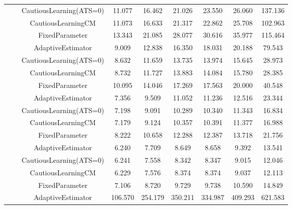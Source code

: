 \begin{table}[!h]
\begin{tabular}[t]{ccccccccc}
 &  & CautiousLearning(ATS=0) & 11.077 & 16.462 & 21.026 & 23.550 & 26.060 & 137.136\\

 &  & CautiousLearningCM & 11.073 & 16.633 & 21.317 & 22.862 & 25.708 & 102.963\\

 & \multirow[t]{-4}{*}{\centering\arraybackslash 0.75} & FixedParameter & 13.343 & 21.085 & 28.077 & 30.616 & 35.977 & 115.464\\
\cmidrule{2-9}
 &  & AdaptiveEstimator & 9.009 & 12.838 & 16.350 & 18.031 & 20.188 & 79.543\\

 &  & CautiousLearning(ATS=0) & 8.632 & 11.659 & 13.735 & 13.974 & 15.645 & 28.973\\

 &  & CautiousLearningCM & 8.732 & 11.727 & 13.883 & 14.084 & 15.780 & 28.385\\

 & \multirow[t]{-4}{*}{\centering\arraybackslash 1.00} & FixedParameter & 10.095 & 14.046 & 17.269 & 17.563 & 20.000 & 40.548\\
\cmidrule{2-9}
 &  & AdaptiveEstimator & 7.356 & 9.509 & 11.052 & 11.236 & 12.516 & 23.344\\

 &  & CautiousLearning(ATS=0) & 7.198 & 9.091 & 10.289 & 10.340 & 11.343 & 16.834\\

 &  & CautiousLearningCM & 7.179 & 9.124 & 10.357 & 10.391 & 11.377 & 16.988\\

 & \multirow[t]{-4}{*}{\centering\arraybackslash 1.25} & FixedParameter & 8.222 & 10.658 & 12.288 & 12.387 & 13.718 & 21.756\\
\cmidrule{2-9}
 &  & AdaptiveEstimator & 6.240 & 7.709 & 8.649 & 8.658 & 9.392 & 13.541\\

 &  & CautiousLearning(ATS=0) & 6.241 & 7.558 & 8.342 & 8.347 & 9.015 & 12.046\\

 &  & CautiousLearningCM & 6.229 & 7.576 & 8.374 & 8.374 & 9.037 & 12.113\\

\multirow[t]{-28}{*}{\centering\arraybackslash 1} & \multirow[t]{-4}{*}{\centering\arraybackslash 1.50} & FixedParameter & 7.106 & 8.720 & 9.729 & 9.738 & 10.590 & 14.849\\
\cmidrule{1-9}
 &  & AdaptiveEstimator & 106.570 & 254.179 & 350.211 & 334.987 & 409.293 & 621.583\\


\end{tabular}
\end{table}
